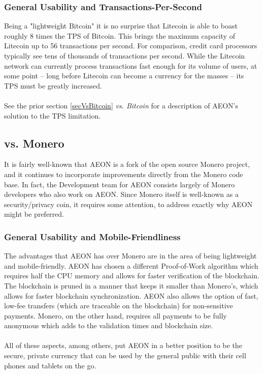 \subsubsection{General Usability and Transactions-Per-Second}
Being a "lightweight Bitcoin" it is no surprise that Litecoin is able to boast roughly 8 times the TPS of Bitcoin.  This brings the maximum capacity of Litecoin up to 56 transactions per second. For comparison, credit card processors typically see tens of thousands of transactions per second. While the Litecoin network can currently process transactions fast enough for its volume of users, at some point -- long before Litecoin can become a currency for the masses -- its TPS must be greatly increased.\\
\\
See the prior section \ref{secVsBitcoin} \textit{vs. Bitcoin} for a description of AEON's solution to the TPS limitation.

\subsection{vs. Monero}
It is fairly well-known that AEON is a fork of the open source Monero project, and it continues to incorporate improvements directly from the Monero code base.  In fact, the Development team for AEON consists largely of Monero developers who also work on AEON.  Since Monero itself is well-known as a security/privacy coin, it requires some attention, to address exactly why AEON might be preferred.

\subsubsection{General Usability and Mobile-Friendliness}
The advantages that AEON has over Monero are in the area of being lightweight and mobile-friendly.  AEON has chosen a different Proof-of-Work algorithm which requires half the CPU memory and allows for faster verification of the blockchain.  The blockchain is pruned in a manner that keeps it smaller than Monero's, which allows for faster blockchain synchronization.  AEON also allows the option of fast, low-fee transfers (which are traceable on the blockchain) for non-sensitive payments.  Monero, on the other hand, requires all payments to be fully anonymous which adds to the validation times and blockchain size.\\
\\
All of these aspects, among others, put AEON in a better position to be the secure, private currency that can be used by the general public with their cell phones and tablets on the go.


